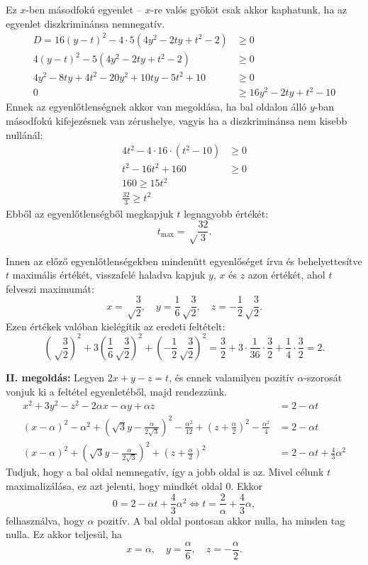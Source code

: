 \documentclass[a4paper,10pt]{article}
\begin{document}
Ez $x$-ben másodfokú egyenlet -- $x$-re valós gyököt csak akkor kaphatunk, ha az egyenlet diszkriminánsa nemnegatív.
\begin{align*}
D=16(y-t)^2-4\cdot5\left(4y^2-2ty+t^2-2\right)&\ge0\\
4(y-t)^2-5\left(4y^2-2ty+t^2-2\right)&\ge0\\
4y^2-8ty+4t^2-20y^2+10ty-5t^2+10&\ge0\\
0&\ge16y^2-2ty+t^2-10
\end{align*}
Ennek az egyenlőtlenségnek akkor van megoldása, ha bal oldalon álló $y$-ban másodfokú kifejezésnek van zérushelye, vagyis ha a diszkriminánsa nem kisebb nullánál:
\begin{align*}
4t^2-4\cdot16\cdot\left(t^2-10\right)&\ge0\\
t^2-16t^2+160&\ge0\\
160\ge15t^2\\
\frac{32}{3}\ge t^2
\end{align*}
Ebből az egyenlőtlenségből megkapjuk $t$ legnagyobb értékét:
\[t_{\max}=\sqrt\frac{32}{3}.\]

Innen az előző egyenlőtlenségekben mindenütt egyenlőséget írva és behelyettesítve $t$ maximális értékét, visszafelé haladva kapjuk $y$, $x$ és $z$ azon értékét, ahol $t$ felveszi maximumát:
\[x=\sqrt\frac32,\quad y=\frac16\sqrt\frac32,\quad z=-\frac12\sqrt\frac32.\]
Ezen értékek valóban kielégítik az eredeti feltételt: 
\[\left(\sqrt\frac32\right)^2+3\left(\frac16\sqrt\frac32\right)^2+ \left(-\frac12\sqrt\frac32\right)^2=
\frac32+3\cdot\frac{1}{36}\cdot\frac32+\frac14\cdot\frac32=2.\]

\medskip

{\bf II. megoldás: } Legyen $2x+y-z=t$, és ennek valamilyen pozitív $\alpha$-szorosát vonjuk ki a feltétel egyenletéből, majd rendezzünk.
\begin{align*}
x^2+3y^2-z^2-2\alpha x-\alpha y+\alpha z&=2-\alpha t\\
(x-\alpha)^2-\alpha^2+\left(\sqrt3y-\frac{\alpha}{2\sqrt3}\right)^2-\frac{\alpha^2}{12}+\left(z+\frac{\alpha}{2}\right)^2-\frac{\alpha^2}{4}&=2-\alpha t\\
(x-\alpha)^2+\left(\sqrt3y-\frac{\alpha}{2\sqrt3}\right)^2+\left(z+\frac{\alpha}{2}\right)^2&=2-\alpha t+\frac43\alpha^2
\end{align*}
Tudjuk, hogy a bal oldal nemnegatív, így a jobb oldal is az. Mivel célunk $t$ maximalizálása, ez azt jelenti, hogy mindkét oldal 0. Ekkor
\[0=2-\alpha t+\frac43\alpha^2 \iff t=\frac{2}{\alpha}+\frac{4}{3}\alpha,\]
felhasználva, hogy $\alpha$ pozitív. A bal oldal pontosan akkor nulla, ha minden tag nulla. Ez akkor teljesül, ha
\[x=\alpha,\quad y=\frac{\alpha}{6},\quad z=-\frac{\alpha}{2}.\]
\end{document}
